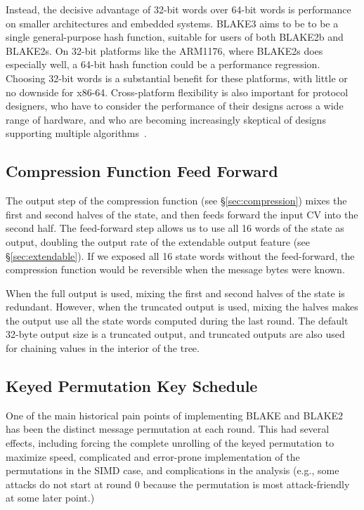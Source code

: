 \documentclass[11pt,notitlepage,a4paper]{article}
\begin{document}
Instead, the decisive advantage of 32-bit words over 64-bit words is
performance on smaller architectures and embedded systems. BLAKE3 aims to be to
be a single general-purpose hash function, suitable for users of both BLAKE2b
and BLAKE2s. On 32-bit platforms like the ARM1176, where BLAKE2s does
especially well, a 64-bit hash function could be a performance regression.
Choosing 32-bit words is a substantial benefit for these platforms, with little
or no downside for x86-64. Cross-platform flexibility is also important for
protocol designers, who have to consider the performance of their designs
across a wide range of hardware, and who are becoming increasingly skeptical of
designs supporting multiple algorithms~\cite{WG}.

\subsection{Compression Function Feed Forward}\label{sec:feedforward}

The output step of the compression function (see \S\ref{sec:compression}) mixes
the first and second halves of the state, and then feeds forward the input CV
into the second half. The feed-forward step allows us to use all 16 words of
the state as output, doubling the output rate of the extendable output feature
(see \S\ref{sec:extendable}). If we exposed all 16 state words without the
feed-forward, the compression function would be reversible when the message
bytes were known.

When the full output is used, mixing the first and second halves of the state
is redundant. However, when the truncated output is used, mixing the halves
makes the output use all the state words computed during the last round. 
The default 32-byte output size is a truncated output, and
truncated outputs are also used for chaining values in the interior of the
tree.

\subsection{Keyed Permutation Key Schedule}\label{sec:keysched}

One of the main historical pain points of implementing BLAKE and BLAKE2 has been the distinct message permutation at each round. This had several effects, including forcing the complete unrolling of the keyed permutation to maximize speed, complicated and error-prone implementation of the permutations in the SIMD case, and complications in the analysis (e.g., some attacks do not start at round 0 because the permutation is most attack-friendly at some later point.)
\end{document}
